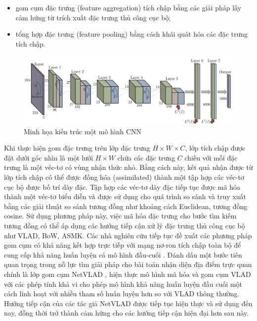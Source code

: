 \begin{itemize}
    \item gom cụm đặc trưng (feature aggregation) tích chập bằng các giải pháp lấy cảm hứng từ trích xuất đặc trưng thủ công cục bộ;
    \item tổng hợp đặc trưng (feature pooling) bằng cách khái quát hóa các đặc trưng tích chập.
\end{itemize}

\begin{figure}[h]
    \centering
    \includegraphics[width=\textwidth]{pics/Chapter2/firstcnns.png}
    \caption{Minh họa kiến trúc một mô hình CNN \cite{babenko2014neural}}
\end{figure}

Khi thực hiện gom đặc trưng trên lớp đặc trưng \(H \times W \times C\), lớp tích chập được đặt dưới góc nhìn là một lưới \(H \times W \) chứa các đặc trưng \(C\) chiều với mỗi đặc trưng là một véc-tơ có vùng nhận thức nhỏ. Bằng cách này, kết quả nhận được từ lớp tích chập có thể được đồng hóa (assimilated) thành một tập hợp các véc-tơ cục bộ được bố trí dày đặc. Tập hợp các véc-tơ dày đặc tiếp tục được mã hóa thành một véc-tơ biểu diễn và được sử dụng cho quá trình so sánh và truy xuất bằng các giải thuật so sánh tương đồng như khoảng cách Euclidean, tương đồng cosine. Sử dụng phương pháp này, việc mã hóa đặc trưng cho bước tìm kiếm tương đồng có thể áp dụng các hướng tiếp cận xử lý đặc trưng thủ công cục bộ như VLAD\cite{vlad}, BoW\cite{Mohedano_2016}, ASMK\cite{cao2020unifying}. Các nhà nghiên cứu tiếp tục đề xuất các phương pháp gom cụm có khả năng kết hợp trực tiếp với mạng nơ-ron tích chập toàn bộ để cung cấp khả năng huấn luyện cả mô hình đầu-cuối \cite{ong2017siamese}. Đánh dấu một bước tiến quan trọng trong nỗ lực tìm giải pháp cho bài toán nhận diện địa điểm trực quan chính là lớp gom cụm NetVLAD \cite{arandjelovic2016netvlad}, hiện thực mô hình mã hóa và gom cụm VLAD với các phép tính khả vi cho phép mô hình khả năng huấn luyện đầu cuối một cách linh hoạt với nhiều tham số huấn luyện hơn so với VLAD thông thường. Hướng tiếp cận của các tác giả NetVLAD được tiếp tục hiện thực và sử dụng đến nay, đồng thời trở thành cảm hứng cho các hướng tiếp cận hiện đại hơn sau này.

